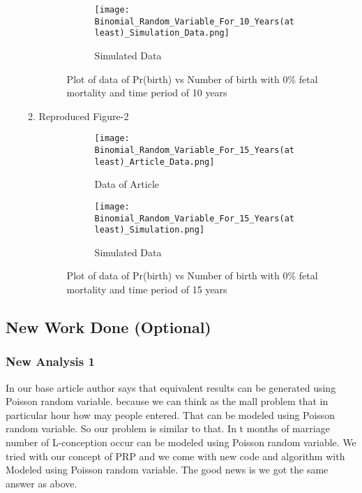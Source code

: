 \documentclass{article}
\begin{document}
\begin{itemize}
\begin{enumerate}
\begin{figure}[htp]
\begin{subfigure}{.5\textwidth}
  \centering
  \texttt{[image: Binomial\_Random\_Variable\_For\_10\_Years(at least)\_Simulation\_Data.png]}
  \caption{Simulated Data}
  \label{fig:sub2}
\end{subfigure}
\caption{Plot of data of Pr(birth) vs Number of birth with 0\% fetal mortality and time period of 10 years}
\label{fig:test}
\end{figure}
\newpage
\item Reproduced Figure-2\\
\begin{figure}[htp]
\centering
\begin{subfigure}{.5\textwidth}
  \centering
  \texttt{[image: Binomial\_Random\_Variable\_For\_15\_Years(at least)\_Article\_Data.png]}
  \caption{Data of Article}
  \label{fig:sub1}
\end{subfigure}%
\begin{subfigure}{.5\textwidth}
  \centering
  \texttt{[image: Binomial\_Random\_Variable\_For\_15\_Years(at least)\_Simulation.png]}
  \caption{Simulated Data}
  \label{fig:sub2}
\end{subfigure}
\caption{Plot of data of Pr(birth) vs Number of birth with 0\% fetal mortality and time period of 15 years}
\label{fig:test}
\end{figure}
\end{enumerate}
\end{itemize}

\subsection{New Work Done (Optional)}
\subsubsection{New Analysis 1}
In our base article author says that equivalent results can be generated using Poisson random variable. because we can think as the mall problem that in particular hour how may people entered. That can be modeled using Poisson random variable. So our problem is similar to that. In t months of marriage number of L-conception occur can be modeled using Poisson random variable. We tried with our concept of PRP and we come with new code and algorithm with Modeled using Poisson random variable. The good news is we got the same answer as above.
\end{document}
